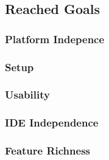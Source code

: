 \subsection{Reached Goals}

\subsubsection{Platform Indepence}
\subsubsection{Setup}
\subsubsection{Usability}
\subsubsection{IDE Independence}
\subsubsection{Feature Richness}